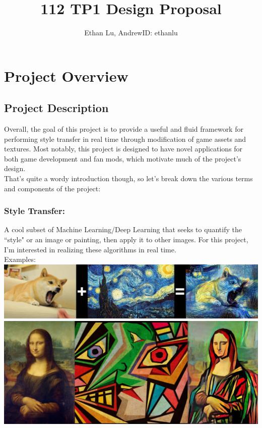 \documentclass[12pt]{article}
\begin{document}
\title{112 TP1 Design Proposal}
\author{Ethan Lu, AndrewID: ethanlu}
\maketitle
\section{Project Overview}

\subsection{Project Description}
    Overall, the goal of this project is to provide a useful and fluid framework for performing style transfer in real time through modification of game assets and textures. 
    Most notably, this project is designed to have novel applications for both game development and fan mods, which motivate much of the project's design. \\
    That's quite a wordy introduction though, so let's break down the various terms and components of the project:

    \subsubsection{Style Transfer:}
    A cool subset of Machine Learning/Deep Learning that seeks to quantify the ``style" or an image or painting, then apply it to other images. 
    For this project, I'm interested in realizing these algorithms in real time.\\
    Examples: \\
    \includegraphics[width=\columnwidth]{ex1.jpg}\\
    \includegraphics[width=\columnwidth]{ex2.jpg}
\end{document}
